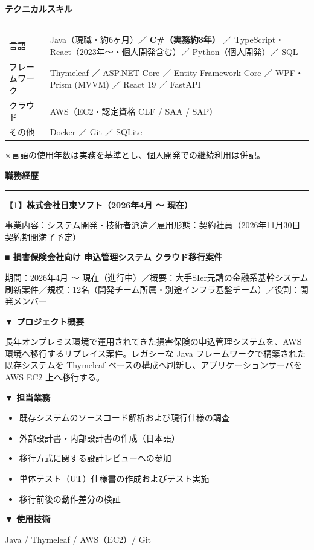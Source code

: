 \documentclass[paper=a4paper,fontsize=10pt,head_space=18mm,foot_space=15mm,gutter=15mm,fore_edge=15mm,baselineskip=16pt]{jlreq}
\newcommand{\kyariku}[1]{%
  \par\vspace{10pt}%
  {\Large\bfseries #1}\par\vspace{4pt}%
  {\color{gray}\rule{\textwidth}{0.4pt}}\par\vspace{6pt}%
}
\newcommand{\project}[1]{%
  \par\vspace{6pt}%
  {\large\bfseries #1}\par\vspace{2pt}%
}
\begin{document}
\kyariku{テクニカルスキル}

\begin{tabular}{@{}p{4.5em}p{\dimexpr\textwidth-4.5em\relax}@{}}
  言語 & Java（現職・約6ヶ月）／ \textbf{C\#（実務約3年）} ／ TypeScript・React（2023年〜・個人開発含む）／ Python（個人開発）／ SQL \\
  フレームワーク & Thymeleaf ／ ASP.NET Core ／ Entity Framework Core ／ WPF・Prism (MVVM) ／ React 19 ／ FastAPI \\
  クラウド & AWS（EC2・認定資格 CLF / SAA / SAP） \\
  その他 & Docker ／ Git ／ SQLite \\
\end{tabular}

\vspace{2pt}
{\small ※言語の使用年数は実務を基準とし、個人開発での継続利用は併記。}

\kyariku{職務経歴}

\project{【1】株式会社日東ソフト（2026年4月 〜 現在）}
事業内容：システム開発・技術者派遣／雇用形態：契約社員（2026年11月30日 契約期間満了予定）

\project{■ 損害保険会社向け 申込管理システム クラウド移行案件}
期間：2026年4月 〜 現在（進行中）／概要：大手SIer元請の金融系基幹システム刷新案件／規模：12名（開発チーム所属・別途インフラ基盤チーム）／役割：開発メンバー

\textbf{▼ プロジェクト概要}\par
長年オンプレミス環境で運用されてきた損害保険の申込管理システムを、AWS環境へ移行するリプレイス案件。レガシーな Java フレームワークで構築された既存システムを Thymeleaf ベースの構成へ刷新し、アプリケーションサーバを AWS EC2 上へ移行する。

\textbf{▼ 担当業務}
\begin{itemize}
  \item 既存システムのソースコード解析および現行仕様の調査
  \item 外部設計書・内部設計書の作成（日本語）
  \item 移行方式に関する設計レビューへの参加
  \item 単体テスト（UT）仕様書の作成およびテスト実施
  \item 移行前後の動作差分の検証
\end{itemize}

\textbf{▼ 使用技術}\par
Java / Thymeleaf / AWS（EC2）/ Git
\end{document}

